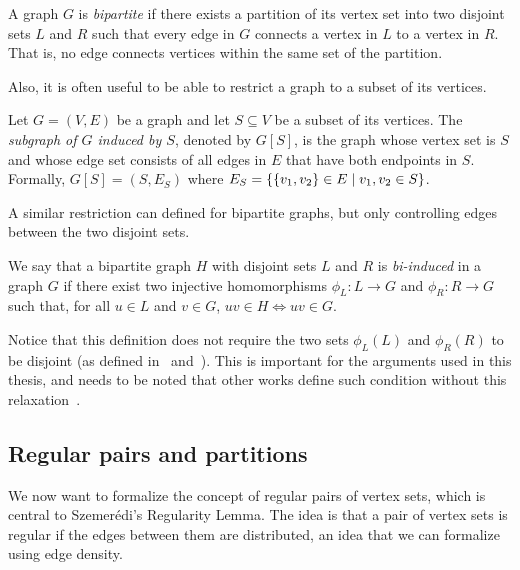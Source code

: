         \begin{definition}
            A graph $G$ is \emph{bipartite} if there exists a partition of its vertex set into two disjoint sets
            $L$ and $R$ such that every edge in $G$ connects a vertex in $L$ to a vertex in $R$.
            That is, no edge connects vertices within the same set of the partition.
        \end{definition}

        Also, it is often useful to be able to restrict a graph to a subset of its vertices.

        \begin{definition}
            Let $G = (V, E)$ be a graph and let $S \subseteq V$ be a subset of its vertices.
            The \emph{subgraph of $G$ induced by $S$}, denoted by $G[S]$, is the graph whose vertex set is $S$ and whose edge
            set consists of all edges in $E$ that have both endpoints in $S$.
            Formally, $G[S] = (S, E_S)$ where $E_S = \{ \{ v_1, v_2 \} \in E \mid v_1, v_2 \in S \}$.
        \end{definition}

        A similar restriction can defined for bipartite graphs, but only controlling edges between the two disjoint sets.

        \begin{definition} \label{def:bi_induced}
            We say that a bipartite graph $H$ with disjoint sets $L$ and $R$ is \emph{bi-induced} in a graph $G$
            if there exist two injective homomorphisms $\phi_L: L \longrightarrow G$ and $\phi_R: R \longrightarrow G$ such that, for all
            $u \in L$ and $v \in G$, $uv \in H \Leftrightarrow uv \in G$.
        \end{definition}

        Notice that this definition does not require the two sets $\phi_L(L)$ and $\phi_R(R)$ to be disjoint
        (as defined in~\cite[pg. 417]{regularity_partitions_and_the_topology_of_graphons}
        and~\cite[pg. 2]{efficient_arithmetic_regularity_and_removal_lemmas_for_induced_bipartite_patterns}).
        This is important for the arguments used in this thesis, and needs to be noted that other works define such
        condition without this relaxation~\cite[pg. 3]{induced_subgraph_density_vi_bounded_vc_dimension}.

    \subsection{Regular pairs and partitions} \label{subsec:subsection_2.2}
        We now want to formalize the concept of regular pairs of vertex sets, which is central to Szemerédi's Regularity Lemma.
        The idea is that a pair of vertex sets is regular if the edges between them are  distributed,
        an idea that we can formalize using edge density.

